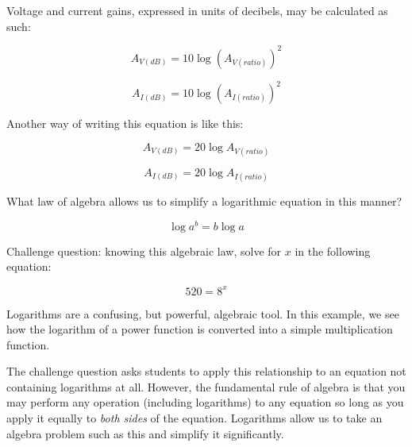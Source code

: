 

Voltage and current gains, expressed in units of decibels, may be calculated as such:

$$A_{V(dB)} = 10 \log \left( {A_{V(ratio)}} \right) ^2$$

$$A_{I(dB)} = 10 \log \left( {A_{I(ratio)}} \right) ^2$$

Another way of writing this equation is like this:

$$A_{V(dB)} = 20 \log A_{V(ratio)}$$

$$A_{I(dB)} = 20 \log A_{I(ratio)}$$

What law of algebra allows us to simplify a logarithmic equation in this manner?







$$\log a^b = b \log a$$

\vskip 10pt

Challenge question: knowing this algebraic law, solve for $x$ in the following equation:

$$520 = 8^x$$







Logarithms are a confusing, but powerful, algebraic tool.  In this example, we see how the logarithm of a power function is converted into a simple multiplication function.

The challenge question asks students to apply this relationship to an equation not containing logarithms at all.  However, the fundamental rule of algebra is that you may perform any operation (including logarithms) to any equation so long as you apply it equally to {\it both sides} of the equation.  Logarithms allow us to take an algebra problem such as this and simplify it significantly.




